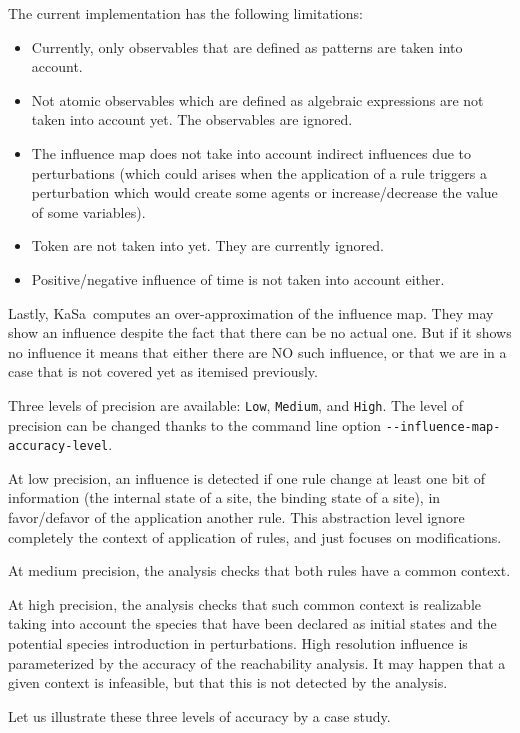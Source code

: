 \documentclass[11pt]{book}
\begin{document}
The current implementation has the following limitations:
\begin{itemize}
\item Currently, only observables that are defined as patterns are taken into account.
\item Not atomic observables which are defined as algebraic expressions are not taken into account yet. The observables are ignored.
\item The influence map does not take into account indirect influences due to perturbations (which could arises when the application of a rule triggers a perturbation which would create some agents or increase/decrease the value of some variables).
\item Token are not taken into yet. They are currently ignored.
\item Positive/negative influence of time is not taken into account either.
\end{itemize}

Lastly, KaSa\ computes an over-approximation of the influence map. They may show an influence despite the fact that there can be no actual one. But if it shows no influence it means that either there are NO such influence, or that we are in a case that is not covered yet as itemised previously.

Three levels of precision are available: \texttt{Low}, \texttt{Medium}, and
\texttt{High}. The level of precision can be changed thanks to the command line option \texttt{-{}-influence-map-accuracy-level}.

At low precision, an influence is detected if one rule change at least one bit of information (the internal state of a site, the binding state of a site), in favor/defavor of the application another rule. This abstraction level ignore completely the context of application of rules, and just focuses on modifications.

At medium precision, the analysis checks that both rules have a common context.

At high precision, the analysis checks that such common context is realizable taking into account the species that have been declared as initial states
and the potential species introduction in perturbations. High resolution influence is parameterized by the accuracy of the reachability analysis.
It may happen that a given context is infeasible, but that this is not detected by the analysis.

Let us illustrate these three levels of accuracy by a case study.
\end{document}
